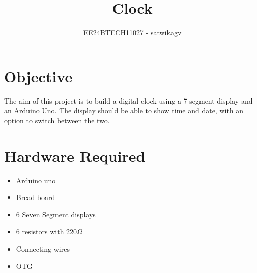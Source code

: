 \documentclass[journal]{IEEEtran}
\begin{document}

\vspace{3cm}

\title{Clock}
\author{EE24BTECH11027 - satwikagv}
{\let\newpage\relax\maketitle}

\renewcommand{\thefigure}{\theenumi}
\renewcommand{\thetable}{\theenumi}
\setlength{\intextsep}{10pt} %


\renewcommand{\thetable}{\theenumi}

 \section*{\textbf{Objective}}
The aim of this project is to build a digital clock using a 7-segment display and an Arduino Uno. The display should be able to show time and date, with an option to switch between the two.

\section*{\textbf{Hardware Required}}
\begin{itemize}
    \item Arduino uno
    \item Bread board
    \item 6 Seven Segment displays 
    \item 6 resistors with 220$\Omega$
    \item Connecting wires 
    \item OTG
\end{itemize}
\end{document}
